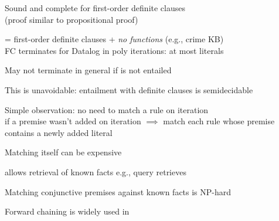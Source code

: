 \documentclass{article}
\begin{document}
\begin{huge}
Sound and complete for first-order definite clauses\\
(proof similar to propositional proof)

 = first-order definite clauses + \emph{no functions} (e.g., crime KB)\\
FC terminates for Datalog in poly iterations: at most  literals

May not terminate in general if \mat{$\alpha$} is not entailed

This is unavoidable: entailment with definite clauses is semidecidable


Simple observation: no need to match a rule on iteration \\
if a premise wasn't added on iteration \nl
$\implies$ match each rule whose premise contains a newly added literal

Matching itself can be expensive

 allows  retrieval of known facts\al
e.g., query  retrieves 

Matching conjunctive premises against known facts is NP-hard

Forward chaining is widely used in 


\begin{minipage}[c]{0.42\maxfigwidth}
\maxfigwidth
\centerline{}
\end{minipage}%
\hfill
\begin{minipage}[c]{0.58\maxfigwidth}
\noindent 
\tab{}
\\[4pt]
\tab\tab\tab{}
\\[4pt]
\tab\tab\tab{}
\\[4pt]
\tab\tab\tab{}
\\[4pt]
\tab\tab\tab{}
\\[8pt]
\tab{}
\\[4pt]
\tab{}
\\[4pt]
\tab{}
\end{minipage}


\end{huge}
\end{document}
